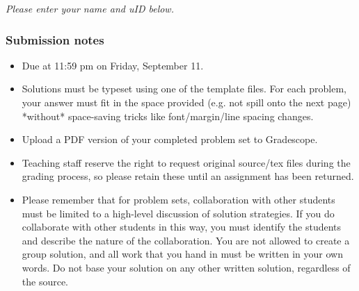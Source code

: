 \documentclass{article}
\begin{document}
{\it Please enter your name and uID below.}

\vspace{3em}

\par
{}
\par

\vfill

\subsubsection*{Submission notes}
\begin{itemize}
  \item Due at 11:59 pm on Friday, September 11.
  \item Solutions must be typeset using one of the template files. For each problem, your answer must fit in the space provided (e.g. not spill onto the next page) *without* space-saving tricks like font/margin/line spacing changes.
  \item Upload a PDF version of your completed problem set to Gradescope.
  \item Teaching staff reserve the right to request original source/tex files during the grading process, so please retain these until an assignment has been returned.
  \item Please remember that for problem sets, collaboration with other students must be limited to a high-level discussion of solution strategies. If you do collaborate with other students in this way, you must identify the students and describe the nature of the collaboration. You are not allowed to create a group solution, and all work that you hand in must be written in your own words. Do not base your solution on any other written solution, regardless of the source.
\end{itemize}

\pagebreak
\end{document}
